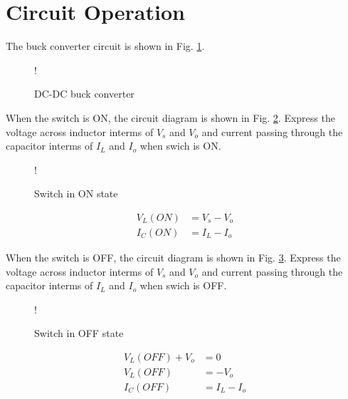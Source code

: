 \documentclass[journal,12pt,twocolumn]{IEEEtran}
\begin{document}
\section{Circuit Operation}
The buck converter circuit is shown in Fig. \ref{fig1}.
\begin{figure}[!h]
\centering
\resizebox {\columnwidth} {!} {

}
\caption{DC-DC buck converter} 
\label{fig1}
\end{figure}
%
\begin{problem}
When the switch is ON, the circuit diagram is shown in Fig. \ref{fig2}. Express the voltage across inductor interms of $V_{s}$ and $V_{o}$ and current passing through the capacitor interms of $I_{L}$ and $I_{o}$ when swich is ON.  
\end{problem}
\begin{figure}[!h]
       \centering  
 \resizebox {\columnwidth} {!} {

}   
    \caption{Switch in ON state}\label{fig2}
   \end{figure} 
  \solution
  \begin{align*}
  V_{L}(ON) &= V_{s} - V_{o}\\
  I_{C}(ON) &= I_{L} - I_{o}
\end{align*} 
\begin{problem}
When the switch is OFF, the circuit diagram is shown in Fig. \ref{fig3}.  Express the voltage across inductor interms of $V_{s}$ and $V_{o}$ and current passing through the capacitor interms of $I_{L}$ and $I_{o}$ when swich is OFF.  
  \end{problem}
%
 \begin{figure}[!h]
       \centering  
\resizebox {\columnwidth} {!} {

} 
    \caption{Switch in OFF state}\label{fig3}
   \end{figure}
  \solution
  \begin{align*}
  V_{L}(OFF) +  V_{o}&=0\\
  V_{L}(OFF) &= - V_{o}\\
  I_{C}(OFF) &= I_{L} - I_{o}
\end{align*}  
\end{document}
